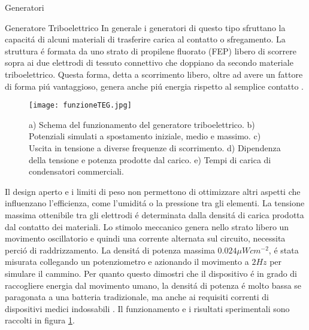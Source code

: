 \begin{section}{Generatori}
    \begin{subsection}{Generatore Triboelettrico}
        In generale i generatori di questo tipo sfruttano la capacit\'a di alcuni materiali di trasferire carica al contatto o sfregamento. La struttura \'e formata da uno strato di propilene fluorato (FEP) libero di scorrere sopra ai due elettrodi di tessuto connettivo che doppiano da secondo materiale triboelettrico. Questa forma, detta a scorrimento libero, oltre ad avere un fattore di forma pi\'u vantaggioso, genera anche pi\'u energia rispetto al semplice contatto \cite{fuAchievingUltraDurabilityHigh2024}. 
        \begin{figure}[H]
            \texttt{[image: funzioneTEG.jpg]}
            \centering
            \caption{a) Schema del funzionamento del generatore triboelettrico. b) Potenziali simulati a spostamento iniziale, medio e massimo. c) Uscita in tensione a diverse frequenze di scorrimento. d) Dipendenza della tensione e potenza prodotte dal carico. e) Tempi di carica di condensatori commerciali.\cite{kouWearableAllFabricHybrid2024}}
            \label{fig:funzioneTEG}
        \end{figure}
        Il design aperto e i limiti di peso non permettono di ottimizzare altri aspetti che influenzano l'efficienza, come l'umidit\'a o la pressione tra gli elementi. La tensione massima ottenibile tra gli elettrodi \'e determinata dalla densit\'a di carica prodotta dal contatto dei materiali. Lo stimolo meccanico genera nello strato libero un movimento oscillatorio e quindi una corrente alternata sul circuito, necessita perci\'o di raddrizzamento. La densit\'a di potenza massima \(0.024\mu Wcm^{-2}\), \'e stata misurata collegando un potenziometro e azionando il movimento a \(2Hz\) per simulare il cammino. Per quanto questo dimostri che il dispositivo \'e in grado di raccogliere energia dal movimento umano, la densit\'a di potenza \'e molto bassa se paragonata a una batteria tradizionale, ma anche ai requisiti correnti di dispositivi medici indossabili \cite{gaoAdvancedEnergyHarvesters2024}. Il funzionamento e i risultati sperimentali sono raccolti in figura \ref{fig:funzioneTEG}.
        
    \end{subsection}
    

\end{section}
